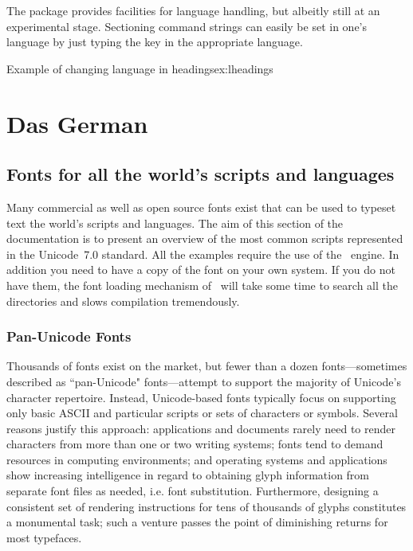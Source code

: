 The  package provides facilities for language handling, but albeitly still at an experimental stage. Sectioning command strings can easily be set in one's language by just typing the key in the appropriate language.

\begin{texexample}{Example of changing language in headings}{ex:lheadings}
\chapter{Das German}
\end{texexample}


\section{Fonts for all the world's scripts and languages}

Many commercial as well as open source fonts exist that can be used to typeset text the world's scripts and languages. The aim of this section of the documentation is to present an overview of the most common scripts represented in the Unicode~7.0 standard. All the examples require the use of the \XeTeX\ engine. In addition you need to have a copy of the font on your own system. If you do not have them, the font loading mechanism of \XeTeX\ will take some time to search all the directories and slows compilation tremendously. 

\subsection{Pan-Unicode Fonts}

Thousands of fonts exist on the market, but fewer than a dozen fonts—sometimes described as ``pan-Unicode" fonts—attempt to support the majority of Unicode's character repertoire. Instead, Unicode-based fonts typically focus on supporting only basic ASCII and particular scripts or sets of characters or symbols. Several reasons justify this approach: applications and documents rarely need to render characters from more than one or two writing systems; fonts tend to demand resources in computing environments; and operating systems and applications show increasing intelligence in regard to obtaining glyph information from separate font files as needed, i.e. font substitution. Furthermore, designing a consistent set of rendering instructions for tens of thousands of glyphs constitutes a monumental task; such a venture passes the point of diminishing returns for most typefaces.

